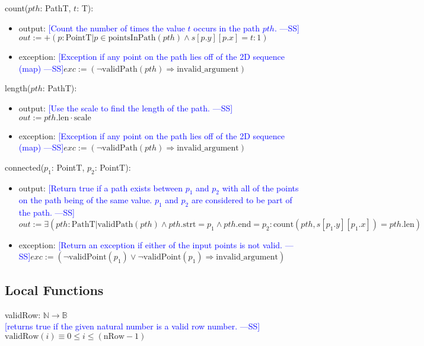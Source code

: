 \documentclass[12pt]{article}
\newcommand{\authornote}[3]{\textcolor{#1}{[#3 ---#2]}}
\newcommand{\authornote}[3]{}
\newcommand{\wss}[1]{\authornote{blue}{SS}{#1}}
\begin{document}
\noindent count($\mathit{pth}$: PathT, $t$: T):
\begin{itemize}
\item output: \wss{Count the number of times the value $t$ occurs in the path
    $pth$.}$out := +(p: \mbox{PointT} | p \in \mbox{pointsInPath}(\mathit{pth})
  \wedge s[p.y][p.x] = t : 1)$
\item exception: \wss{Exception if any point on the path lies off of the 2D
    sequence (map)}$exc := (\neg\mbox{validPath}(\mathit{pth}) \Rightarrow \mbox{invalid\_argument})$
\end{itemize}

\noindent length($\mathit{pth}$: PathT):
\begin{itemize}
\item output: \wss{Use the scale to find the length of the
    path.}$out := \mathit{pth}.\mbox{len} \cdot \mbox{scale}$
\item exception: \wss{Exception if any point on the path lies off of the 2D
    sequence (map)}$exc := (\neg\mbox{validPath}(\mathit{pth}) \Rightarrow \mbox{invalid\_argument})$
\end{itemize}

\noindent connected($p_1$: PointT, $p_2$: PointT):
\begin{itemize}
\item output: \wss{Return true if a path exists between $p_1$ and $p_2$ with all
    of the points on the path being of the same value.  $p_1$ and $p_2$ are
    considered to be part of the path.}
  $out := \exists (\mathit{pth}: \mbox{PathT} | \mbox{validPath}(\mathit{pth})
  \wedge \mathit{pth}.\mbox{strt} = p_1 \wedge \mathit{pth}.\mbox{end} = p_2 :
  \mbox{count}(\mathit{pth}, s[p_1.y][p_1.x]) = \mathit{pth}.\mbox{len})$
\item exception: \wss{Return an exception if either of the input points is not
    valid.}$exc := (\neg\mbox{validPoint}(p_1) \vee \neg\mbox{validPoint}(p_1)
  \Rightarrow \mbox{invalid\_argument})$

\end{itemize}

\subsection*{Local Functions}

\noindent validRow: $\mathbb{N} \rightarrow \mathbb{B}$\\
\noindent \wss{returns true if the given natural number is a valid row
  number.}$\mbox{validRow}(i) \equiv 0 \leq i \leq (\mbox{nRow} - 1)$\\
\end{document}
